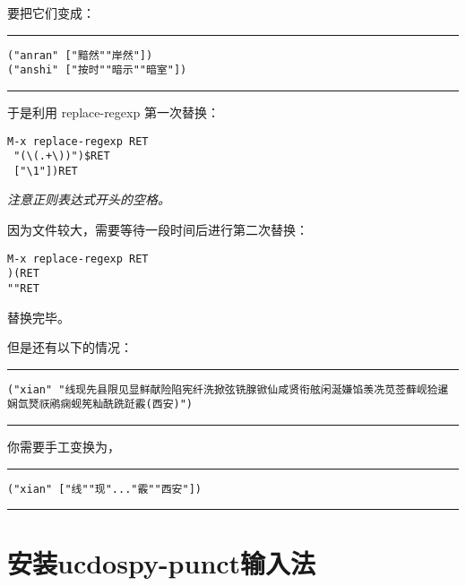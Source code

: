 \documentclass[letterpaper]{article}
\begin{document}
\begin{CJK*}{GB}{song}
要把它们变成：
\begin{tscreen}
\par
\addvspace{\medskipamount}
\nopagebreak\hrule
\begin{verbatim}
("anran" ["黯然""岸然"])
("anshi" ["按时""暗示""暗室"])
\end{verbatim} 
\nopagebreak\hrule 
\addvspace{\medskipamount}
\end{tscreen}

于是利用 replace-regexp 第一次替换：
\begin{tscreen}
\begin{verbatim}
M-x replace-regexp RET
 "(\(.+\))")$RET
 ["\1"])RET
\end{verbatim}
\end{tscreen}

{\itshape 注意正则表达式开头的空格。\/}

因为文件较大，需要等待一段时间后进行第二次替换：
\begin{tscreen}
\begin{verbatim}
M-x replace-regexp RET
)(RET
""RET
\end{verbatim}
\end{tscreen}

替换完毕。

但是还有以下的情况：
\begin{tscreen}
\par
\addvspace{\medskipamount}
\nopagebreak\hrule
\begin{verbatim}
("xian" "线现先县限见显鲜献险陷宪纤洗掀弦铣腺锨仙咸贤衔舷闲涎嫌馅羡冼苋莶藓岘猃暹娴氙燹祆鹇痫蚬筅籼酰跣跹霰(西安)")
\end{verbatim} 
\nopagebreak\hrule 
\addvspace{\medskipamount}
\end{tscreen}

你需要手工变换为，
\begin{tscreen}
\par
\addvspace{\medskipamount}
\nopagebreak\hrule
\begin{verbatim}
("xian" ["线""现"..."霰""西安"])
\end{verbatim} 
\nopagebreak\hrule 
\addvspace{\medskipamount}
\end{tscreen}





\section{安装ucdospy-punct输入法}


\end{CJK*}
\end{document}
